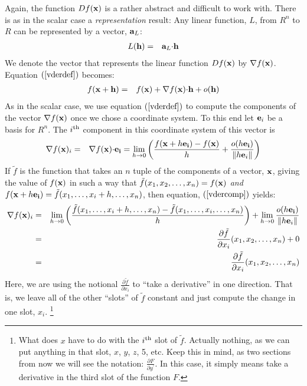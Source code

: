 \documentclass{article}
\begin{document}
Again, the function $Df({\bf x})$ is a rather abstract and difficult to work with.
There is as in the scalar case a {\em representation\/} result:
Any linear function, $L$, from $R^n$ to $R$ can be represented by a vector, ${\bf a}_L$:
\begin{eqnarray}
  L({\bf h}) & = & {\bf a}_L {\bf \cdot} {\bf h}
\end{eqnarray}
We denote the vector that represents the linear function $Df({\bf x})$ by
$\nabla f({\bf x})$. Equation $(\ref{vderdef})$ becomes:
\begin{eqnarray}
  f({\bf x} + {\bf h}) & = & f({\bf x}) + \nabla f({\bf x}) {\bf \cdot} {\bf h} + o({\bf h}) \label{vderdef2}
\end{eqnarray}
As in the scalar case, we use equation $(\ref{vderdef})$
to compute the components of the vector $\nabla f({\bf x})$ once we chose
a coordinate system. To this end let ${\bf e}_i$ be a basis for $R^n$. The $i^{\rm th}$
component in this coordinate system of this vector is
\begin{eqnarray}
  \nabla f({\bf x})_i & = &  \nabla f({\bf x}){\bf \cdot} {\bf e_i} =
  \lim_{h \rightarrow 0} \left( \frac{f({\bf x} + h {\bf e_i}) - f({\bf x})}{h} + \frac{o(h {\bf e_i})}{\|h {\bf e}_i\|}\right) \label{vdercomp}
\end{eqnarray}
If ${\tilde f}$
is the function that takes an $n$ tuple of the components of a vector, ${\bf x}$,
giving the value of $f({\bf x})$ in such a way that
${\tilde f}(x_1, x_2, \ldots, x_n) = f({\bf x})$ {\em and\/}
$f({\bf x} + h {\bf e_i}) = {\tilde f}(x_1, \ldots, x_i + h, \ldots, x_n)$,
then equation, $(\ref{vdercomp})$ yields:
\begin{eqnarray}
  \nabla f({\bf x})_i & = &
    \lim_{h \rightarrow 0} \left(\frac{{\tilde f}(x_1, \ldots, x_i + h, \ldots, x_n) - {\tilde f}(x_1, \ldots, x_i, \ldots, x_n)}{h}\right)
    + \lim_{h \rightarrow 0} \frac{o(h {\bf e_i})}{\|h {\bf e}_i\|}
    \nonumber \\
& = & \frac{\partial {\tilde f}}{\partial x_i}(x_1, x_2, \ldots, x_n) + 0 \nonumber \\
& = & \frac{\partial {\tilde f}}{\partial x_i}(x_1, x_2, \ldots, x_n)
\end{eqnarray}
 Here, we are using the notional $\frac{\partial {\tilde f}}{\partial x_i}$ to
``take a derivative''{} in one direction. That is, we leave all of the other ``slots''{}
of ${\tilde f}$ constant and just compute the change in one slot, $x_i$.%
\footnote{What does $x$ have to do with the $i^{\rm th}$ slot of ${\tilde f}$. Actually
nothing, as we can put anything in that slot, $x$, $y$, $z$, 5, etc. Keep this in mind,
as two sections from now we will see the notation: $\frac{\partial F}{\partial y^\prime}$.
In this case, it simply means take a derivative in the third slot of the function $F$.}
\end{document}
